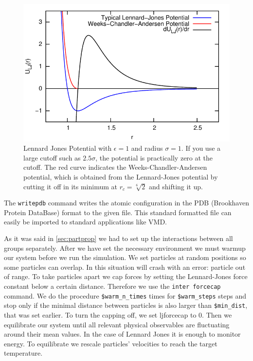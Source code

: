 \documentclass[
paper=a4,                       %
fontsize=11pt,                  %
twoside,                        %
footsepline,                    %
headsepline,                    %
headinclude=false,              %
footinclude=false,              %
pagesize,                       %
]{scrartcl}
\begin{document}
\begin{figure}[ht]
\begin{center}
\includegraphics[width=12cm]{figures/lennard-jones-potential.pdf}
\caption[long text]{Lennard Jones Potential with
  $\epsilon=1$ and radius $\sigma=1$. If you use a large cutoff such as
  $2.5\sigma$, the potential is practically zero at the cutoff. The
  red curve indicates the Weeks-Chandler-Andersen potential, which
  is obtained from the Lennard-Jones potential by cutting it off in
  its minimum at $r_c=\sqrt[6]{2}$ and shifting it up.}
\label{pic:lennard-jones}
\end{center}
\end{figure}

\noindent 
The \lstinline|writepdb| command writes the atomic configuration in the PDB (Brookhaven Protein DataBase) format to the given file. This standard formatted file can easily be imported to standard applications like VMD. 

As it was said in \ref{sec:partprop} we had to set up the interactions between all groups separately. 
After we have set the necessary environment we must warmup our system before we run the simulation. We set 
particles at random positions so some particles can overlap. In this situation \es  will crash with an error:
particle out of range. To take particles apart 
we cap forces  by setting the Lennard-Jones force constant below a certain distance. 
Therefore we use the \lstinline|inter forcecap| command. We do the procedure  \verb"$warm_n_times" times 
for \verb"$warm_steps" steps and stop only if the minimal distance between particles is also larger than 
\verb"$min_dist", that was set earlier.  To turn 
the capping off, we set ljforcecap to 0. Then  we equilibrate our system until all relevant physical observables
are fluctuating around their mean values. In the case of Lennard Jones it is enough to monitor energy. 
To equilibrate we rescale particles' velocities to reach the target temperature.
\end{document}
